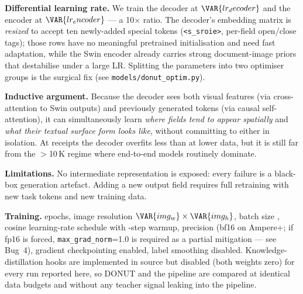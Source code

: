 \textbf{Differential learning rate.}\label{sec:donut_lr}
We train the decoder at $\VAR{lr_decoder}$ and the encoder at
$\VAR{lr_encoder}$ --- a 10$\times$ ratio.  The decoder's embedding
matrix is \emph{resized} to accept ten newly-added special tokens
(\texttt{<s\_sroie>}, per-field open/close tags); those rows have no
meaningful pretrained initialisation and need fast adaptation, while
the Swin encoder already carries strong document-image priors that
destabilise under a large LR.  Splitting the parameters into two
optimiser groups is the surgical fix (see \texttt{models/donut\_optim.py}).

\textbf{Inductive argument.}
Because the decoder sees both visual features (via cross-attention to
Swin outputs) and previously generated tokens (via causal
self-attention), it can simultaneously learn \emph{where fields
tend to appear spatially} and \emph{what their textual surface form
looks like}, without committing to either in isolation.  At
 receipts the decoder overfits less than at lower
data, but it is still far from the $>$10\,K regime where end-to-end
models routinely dominate.

\textbf{Limitations.}
No intermediate representation is exposed: every failure is a
black-box generation artefact.  Adding a new output field requires
full retraining with new task tokens and new training data.

\textbf{Training.}
 epochs, image resolution
$\VAR{img_w}\times\VAR{img_h}$, batch size ,
cosine learning-rate schedule with -step warmup,
\texttt{} precision (bf16 on Ampere+; if fp16 is
forced, \texttt{max\_grad\_norm}=1.0 is required as a partial
mitigation --- see Bug~4), gradient
checkpointing enabled, label smoothing disabled.
Knowledge-distillation hooks are implemented in source but disabled
(both weights zero) for every run reported here, so DONUT and the
pipeline are compared at identical data budgets and without any
teacher signal leaking into the pipeline.



